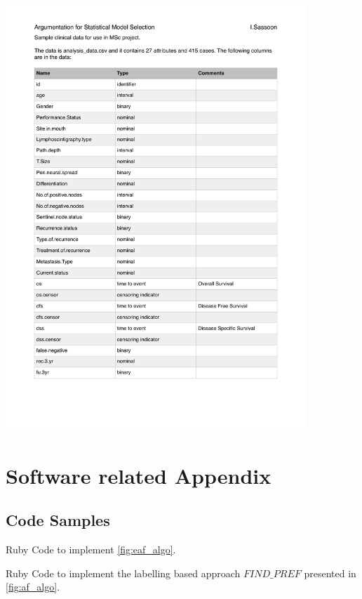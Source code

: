 {	\includegraphics[page=2,width=0.85\textwidth]{appendix/analysis_data.pdf}
}



\section{Software related Appendix}
\label{app:b}
\subsection{Code Samples}

\begin{listing}[H]
	\centering
	\caption{Ruby Code to implement \autoref{fig:eaf_algo}.}
	\label{lst:eaf}
\end{listing}

\begin{listing}[H]
	\centering
	\caption{Ruby Code to implement the labelling based approach $FIND\_PREF$ presented in \autoref{fig:af_algo}.}
	\label{lst:af}
\end{listing}

